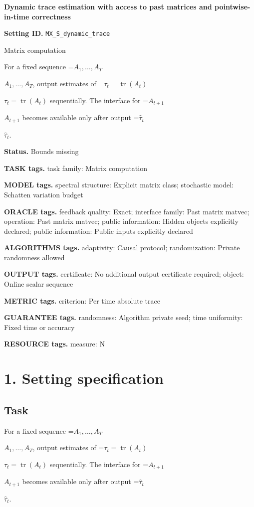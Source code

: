 \documentclass[10pt,a4paper]{article}
\newcommand{\AtlasMath}[1]{\par\begingroup\centering\setbox0=\hbox{$\displaystyle #1$}\ifdim\wd0>1.4\linewidth\typeout{ATLAS WIDE FORMULA: \the\wd0}\fi\ifdim\wd0>\linewidth\resizebox{\linewidth}{!}{\box0}\else\box0\fi\par\endgroup}
\newcommand{\AtlasInlineMath}[1]{\begingroup\setbox0=\hbox{$#1$}\ifdim\wd0>.4\linewidth\endgroup\AtlasMath{#1}\else\endgroup$#1$\fi}
\begin{document}
\raggedright

{\LARGE\bfseries\sffamily\color{AtlasNavy} Dynamic trace estimation with access to past matrices and pointwise-in-time correctness\par}\vspace{5pt}
\textbf{Setting ID.} \texttt{MX\_\allowbreak{}S\_\allowbreak{}dynamic\_\allowbreak{}trace}

Matrix computation

For a fixed sequence \AtlasInlineMath{A_1,\ldots,A_T}, output estimates of \AtlasInlineMath{\tau_t=\operatorname{tr}(A_t)} sequentially. The interface for \AtlasInlineMath{A_{t+1}} becomes available only after output \AtlasInlineMath{\widehat\tau_t}.

\textbf{Status.} Bounds missing

\textbf{TASK tags.} task family: Matrix computation

\textbf{MODEL tags.} spectral structure: Explicit matrix class; stochastic model: Schatten variation budget

\textbf{ORACLE tags.} feedback quality: Exact; interface family: Past matrix matvec; operation: Past matrix matvec; public information: Hidden objects explicitly declared; public information: Public inputs explicitly declared

\textbf{ALGORITHMS tags.} adaptivity: Causal protocol; randomization: Private randomness allowed

\textbf{OUTPUT tags.} certificate: No additional output certificate required; object: Online scalar sequence

\textbf{METRIC tags.} criterion: Per time absolute trace

\textbf{GUARANTEE tags.} randomness: Algorithm private seed; time uniformity: Fixed time or accuracy

\textbf{RESOURCE tags.} measure: N

\section{1. Setting specification}
\subsection{Task}
For a fixed sequence \AtlasInlineMath{A_1,\ldots,A_T}, output estimates of \AtlasInlineMath{\tau_t=\operatorname{tr}(A_t)} sequentially. The interface for \AtlasInlineMath{A_{t+1}} becomes available only after output \AtlasInlineMath{\widehat\tau_t}.
\end{document}
